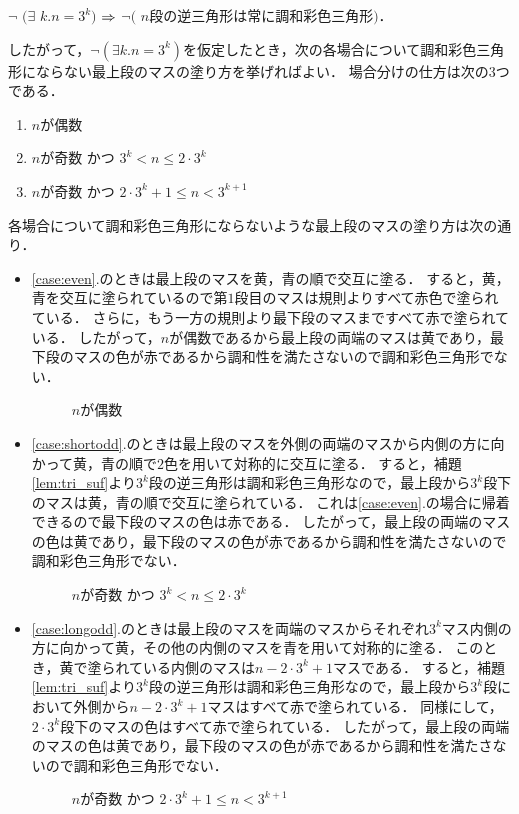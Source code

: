 $\lnot$ $(\exists$ $k.n=3^k)$ $\Rightarrow$ $\lnot($ $n$段の逆三角形は常に調和彩色三角形$)$．

したがって，$\lnot(\exists k.n=3^k)$を仮定したとき，次の各場合について調和彩色三角形にならない最上段のマスの塗り方を挙げればよい．
場合分けの仕方は次の$3$つである．
\begin{enumerate}
\item \label{case:even}
  $n$が偶数
\item \label{case:shortodd}
  $n$が奇数 かつ $3^{k} < n \leq 2 \cdot 3^{k}$
\item \label{case:longodd}
  $n$が奇数 かつ $2 \cdot 3^{k} + 1 \leq n < 3^{k+1}$
\end{enumerate}
各場合について調和彩色三角形にならないような最上段のマスの塗り方は次の通り．
\begin{itemize}
  \item
    \ref{case:even}.のときは最上段のマスを黄，青の順で交互に塗る．
    すると，黄，青を交互に塗られているので第$1$段目のマスは規則よりすべて赤色で塗られている．
    さらに，もう一方の規則より最下段のマスまですべて赤で塗られている．
    したがって，$n$が偶数であるから最上段の両端のマスは黄であり，最下段のマスの色が赤であるから調和性を満たさないので調和彩色三角形でない．
    \begin{figure}[h]
      \centering
      
      \caption{$n$が偶数}
      \label{fig:even_steps}
    \end{figure}
  \item
    \ref{case:shortodd}.のときは最上段のマスを外側の両端のマスから内側の方に向かって黄，青の順で$2$色を用いて対称的に交互に塗る．
    すると，補題\ref{lem:tri_suf}より$3^k$段の逆三角形は調和彩色三角形なので，最上段から$3^k$段下のマスは黄，青の順で交互に塗られている．
    これは\ref{case:even}.の場合に帰着できるので最下段のマスの色は赤である．
    したがって，最上段の両端のマスの色は黄であり，最下段のマスの色が赤であるから調和性を満たさないので調和彩色三角形でない．
    \begin{figure}[h]
      \centering
      
      \caption{$n$が奇数 かつ $3^{k} < n \leq 2 \cdot 3^{k}$}
      \label{fig:shortodd_steps}
    \end{figure}
  \item
    \ref{case:longodd}.のときは最上段のマスを両端のマスからそれぞれ$3^k$マス内側の方に向かって黄，その他の内側のマスを青を用いて対称的に塗る．
    このとき，黄で塗られている内側のマスは$n-2\cdot3^k+1$マスである．
    すると，補題\ref{lem:tri_suf}より$3^k$段の逆三角形は調和彩色三角形なので，最上段から$3^k$段において外側から$n-2\cdot3^k+1$マスはすべて赤で塗られている．
    同様にして，$2\cdot3^k$段下のマスの色はすべて赤で塗られている．
    したがって，最上段の両端のマスの色は黄であり，最下段のマスの色が赤であるから調和性を満たさないので調和彩色三角形でない．
    \begin{figure}[h]
      \centering
      
      \caption{$n$が奇数 かつ $2 \cdot 3^{k} + 1 \leq n < 3^{k+1}$}
      \label{fig:longodd_steps}
    \end{figure}
\end{itemize}

